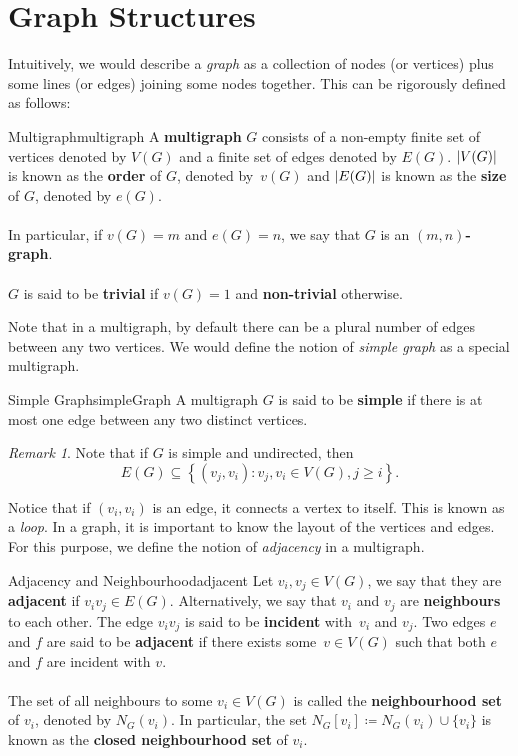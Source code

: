 \documentclass[math]{amznotes}
\theoremstyle{remark}
\newtheorem*{remark}{Remark}
\newcommand{\0}{\mathbf{0}}
\newcommand{\1}{\mathbf{1}}
\begin{document}
\section{Graph Structures}
Intuitively, we would describe a \textit{graph} as a collection of nodes (or vertices) plus some lines (or edges) joining some nodes together. This can be rigorously defined as follows:
\begin{dfnbox}{Multigraph}{multigraph}
    A {\color{red} \textbf{multigraph}} $G$ consists of a non-empty finite set of vertices denoted by $V(G)$ and a finite set of edges denoted by $E(G)$. ${\left\lvert {V(G)} \right\rvert}$ is known as the {\color{red} \textbf{order}} of $G$, denoted by~$v(G)$ and ${\left\lvert {E(G)} \right\rvert}$ is known as the {\color{red} \textbf{size}} of $G$, denoted by $e(G)$.
    \\\\
    In particular, if $v(G) = m$ and $e(G) = n$, we say that $G$ is an {\color{red} \textbf{$(m, n)$-graph}}.
    \\\\
    $G$ is said to be {\color{red} \textbf{trivial}} if $v(G) = 1$ and {\color{red} \textbf{non-trivial}} otherwise.
\end{dfnbox}
Note that in a multigraph, by default there can be a plural number of edges between any two vertices. We would define the notion of \textit{simple graph} as a special multigraph.
\begin{dfnbox}{Simple Graph}{simpleGraph}
    A multigraph $G$ is said to be {\color{red} \textbf{simple}} if there is at most one edge between any two distinct vertices.
\end{dfnbox}
\begin{notebox}
    \begin{remark}
        Note that if $G$ is simple and undirected, then
        \begin{displaymath}
            E(G) \subseteq \left\{(v_j, v_i) \colon v_j, v_i \in V(G), j \geq i\right\}.
        \end{displaymath}
    \end{remark}
\end{notebox}
Notice that if $(v_i, v_i)$ is an edge, it connects a vertex to itself. This is known as a \textit{loop}. In a graph, it is important to know the layout of the vertices and edges. For this purpose, we define the notion of \textit{adjacency} in a multigraph.
\begin{dfnbox}{Adjacency and Neighbourhood}{adjacent}
    Let $v_i, v_j \in V(G)$, we say that they are {\color{red} \textbf{adjacent}} if $v_iv_j \in E(G)$. Alternatively, we say that $v_i$ and $v_j$ are {\color{red} \textbf{neighbours}} to each other. The edge $v_iv_j$ is said to be {\color{red} \textbf{incident}} with~$v_i$ and $v_j$. Two edges $e$ and $f$ are said to be {\color{red} \textbf{adjacent}} if there exists some~$v \in V(G)$ such that both $e$ and $f$ are incident with $v$. 
    \\\\
    The set of all neighbours to some $v_i \in V(G)$ is called the {\color{red} \textbf{neighbourhood set}} of $v_i$, denoted by $N_G(v_i)$. In particular, the set $N_G[v_i] \coloneqq N_G(v_i)\cup\{v_i\}$ is known as the {\color{red} \textbf{closed neighbourhood set}} of $v_i$.
\end{dfnbox}
\end{document}
